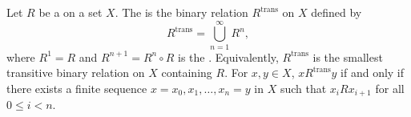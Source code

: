 \begin{definition} \label{definition:transitive_closure_of_a_binary_relation_on_a_set}
Let $R$ be a  on a set $X$. The  is the binary relation $R^{\mathrm{trans}}$ on $X$ defined by
$$
R^{\mathrm{trans}} = \bigcup_{n=1}^{\infty} R^n,
$$
where $R^1 = R$ and $R^{n+1} = R^n \circ R$ is the . Equivalently, $R^{\mathrm{trans}}$ is the smallest transitive binary relation on $X$ containing $R$. For $x, y \in X$, $x R^{\mathrm{trans}} y$ if and only if there exists a finite sequence $x = x_0, x_1, \dots, x_n = y$ in $X$ such that $x_i R x_{i+1}$ for all $0 \le i < n$.
\end{definition}